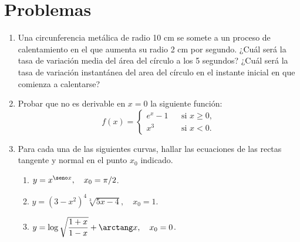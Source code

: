 \documentclass[a4paper]{article}
\begin{document}
\section*{Problemas}
\begin{enumerate}[leftmargin=*]

\item Una circunferencia metálica de radio 10 cm  se somete a un proceso de calentamiento en el que aumenta su radio 2 cm por segundo. ¿Cuál será la tasa de variación media del área del círculo a los 5 segundos? ¿Cuál será la tasa de variación instantánea del area del círculo en el instante inicial en que comienza a calentarse?

\item  Probar que no es derivable en $x=0$ la siguiente función:
\[ f(x)=\left\{
\begin{array}{ccl}
    e^x-1 &  & \mbox{si } x\geq 0,  \\
    x^3 &  & \mbox{si } x<0.
\end{array}\right.
\]

\item  Para cada una de las siguientes curvas, hallar las ecuaciones
de las rectas tangente y normal en el punto $x_{0}$ indicado.
\begin{enumerate}
    \item  $y=x^{\seno x},\quad x_{0}=\pi/2$.

    \item  $y=(3-x^2)^4\sqrt[3]{5x-4},\quad x_{0}=1$.

    \item  $y=\log \sqrt{\dfrac{1+x}{1-x}}+\arctang x, \quad x_{0}=0$.
\end{enumerate}

\end{enumerate}
\end{document}
